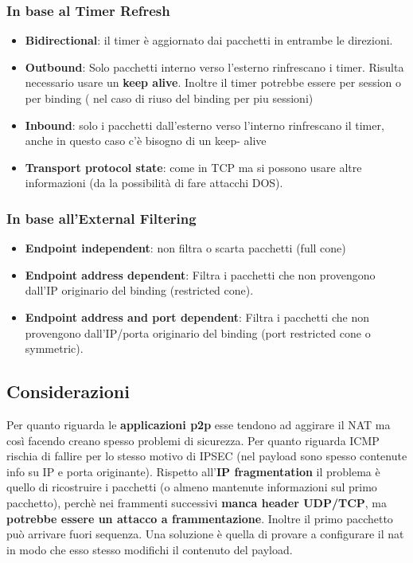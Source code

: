 \documentclass[12pt]{article}
\begin{document}
			\subsubsection{In base al Timer Refresh}
				\begin{itemize}
					\item \textbf{Bidirectional}: il timer è aggiornato dai pacchetti in entrambe le direzioni.
					\item \textbf{Outbound}: Solo pacchetti interno verso l'esterno rinfrescano i timer. Risulta necessario usare un \textbf{keep alive}. Inoltre il timer potrebbe essere per session o per binding ( nel caso di riuso del binding per piu sessioni)
					\item \textbf{Inbound}: solo i pacchetti dall'esterno verso l'interno rinfrescano il timer, anche in questo caso c'è bisogno di un keep- alive
					\item \textbf{Transport protocol state}: come in TCP ma si possono usare altre informazioni (da la possibilità di fare attacchi DOS).
				\end{itemize}
			\subsubsection{In base all'External Filtering }
				\begin{itemize}
					\item \textbf{Endpoint independent}: non filtra o scarta pacchetti (full cone)
					\item \textbf{Endpoint address dependent}: Filtra i pacchetti che non provengono dall'IP originario del binding (restricted cone).
					\item \textbf{Endpoint address and port dependent}:  Filtra i pacchetti che non provengono dall'IP/porta originario del binding (port restricted cone o symmetric).
				\end{itemize}
			\subsection{Considerazioni}
				Per quanto riguarda le \textbf{applicazioni p2p} esse tendono ad aggirare il NAT ma così facendo creano spesso problemi di sicurezza. Per quanto riguarda ICMP rischia di fallire per lo stesso motivo di IPSEC (nel payload sono spesso contenute info su IP e porta originante). Rispetto all'\textbf{IP fragmentation} il problema è quello di ricostruire i pacchetti (o almeno mantenute informazioni sul primo pacchetto), perchè nei frammenti successivi \textbf{manca header UDP/TCP}, ma \textbf{potrebbe essere un attacco a frammentazione}. Inoltre il primo pacchetto può arrivare fuori sequenza. Una soluzione è quella di provare a configurare il nat in modo che esso stesso modifichi il contenuto del payload.
\end{document}
